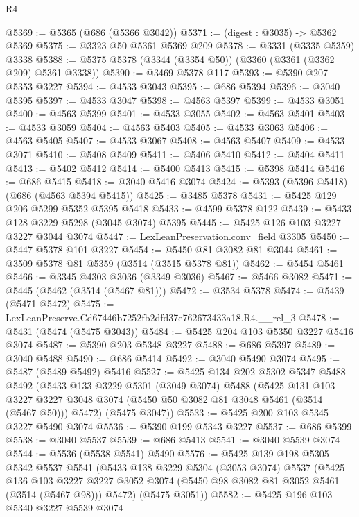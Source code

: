\begin{lexlean}{R4}
\begin{coremodule}
@5369 := @5365 (@686 (@5366 @3042))
@5371 := (digest : @3035) -> @5362 @5369
@5375 := @3323 @50 @5361 @5369 @209
@5378 := @3331 (@3335 @5359) @3338
@5388 := @5375 @5378 (@3344 (@3354 @50)) (@3360 (@3361 (@3362 @209) @5361 @3338))
@5390 := @3469 @5378 @117
@5393 := @5390 @207 @5353 @3227
@5394 := @4533 @3043
@5395 := @686 @5394
@5396 := @3040 @5395
@5397 := @4533 @3047
@5398 := @4563 @5397
@5399 := @4533 @3051
@5400 := @4563 @5399
@5401 := @4533 @3055
@5402 := @4563 @5401
@5403 := @4533 @3059
@5404 := @4563 @5403
@5405 := @4533 @3063
@5406 := @4563 @5405
@5407 := @4533 @3067
@5408 := @4563 @5407
@5409 := @4533 @3071
@5410 := @5408 @5409
@5411 := @5406 @5410
@5412 := @5404 @5411
@5413 := @5402 @5412
@5414 := @5400 @5413
@5415 := @5398 @5414
@5416 := @686 @5415
@5418 := @3040 @5416 @3074
@5424 := @5393 (@5396 @5418) (@686 (@4563 @5394 @5415))
@5425 := @3485 @5378
@5431 := @5425 @129 @206 @5299 @5352 @5395 @5418
@5433 := @4599 @5378 @122
@5439 := @5433 @128 @3229 @5298 (@3045 @3074) @5395
@5445 := @5425 @126 @103 @3227 @3227 @3044 @3074
@5447 := LexLeanPreservation.conv_field @3305
@5450 := @5447 @5378 @101 @3227
@5454 := @5450 @81 @3082 @81 @3044
@5461 := @3509 @5378 @81 @5359 (@3514 (@3515 @5378 @81))
@5462 := @5454 @5461
@5466 := @3345 @4303 @3036 (@3349 @3036)
@5467 := @5466 @3082
@5471 := @5445 (@5462 (@3514 (@5467 @81)))
@5472 := @3534 @5378
@5474 := @5439 (@5471 @5472)
@5475 := LexLeanPreserve.Cd67446b7252fb2dfd37e762673433a18.R4.__rel_3
@5478 := @5431 (@5474 (@5475 @3043))
@5484 := @5425 @204 @103 @5350 @3227 @5416 @3074
@5487 := @5390 @203 @5348 @3227
@5488 := @686 @5397
@5489 := @3040 @5488
@5490 := @686 @5414
@5492 := @3040 @5490 @3074
@5495 := @5487 (@5489 @5492) @5416
@5527 := @5425
    @134
    @202
    @5302
    @5347
    @5488
    @5492
    (@5433
      @133
      @3229
      @5301
      (@3049 @3074)
      @5488
      (@5425
        @131
        @103
        @3227
        @3227
        @3048
        @3074
        (@5450 @50 @3082 @81 @3048 @5461 (@3514 (@5467 @50)))
        @5472)
      (@5475 @3047))
@5533 := @5425 @200 @103 @5345 @3227 @5490 @3074
@5536 := @5390 @199 @5343 @3227
@5537 := @686 @5399
@5538 := @3040 @5537
@5539 := @686 @5413
@5541 := @3040 @5539 @3074
@5544 := @5536 (@5538 @5541) @5490
@5576 := @5425
    @139
    @198
    @5305
    @5342
    @5537
    @5541
    (@5433
      @138
      @3229
      @5304
      (@3053 @3074)
      @5537
      (@5425
        @136
        @103
        @3227
        @3227
        @3052
        @3074
        (@5450 @98 @3082 @81 @3052 @5461 (@3514 (@5467 @98)))
        @5472)
      (@5475 @3051))
@5582 := @5425 @196 @103 @5340 @3227 @5539 @3074

\end{coremodule}
\end{lexlean}
